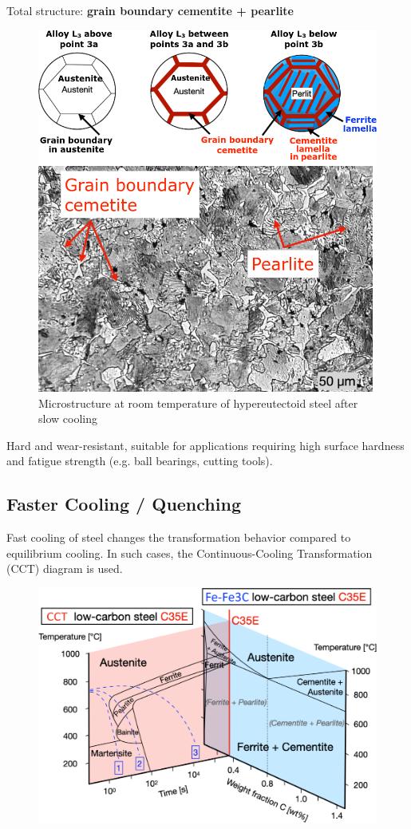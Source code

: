 \documentclass{article}
\begin{document}
Total structure: \textbf{grain boundary cementite + pearlite}

\begin{figure}[ht!]
  \centering
  \includegraphics[width=.7\textwidth]{media/hypereutectic_microstructure.png}
  \caption*{Microstructure at room temperature of hypereutectoid steel after slow cooling}
\end{figure}

Hard and wear-resistant, suitable for applications requiring high surface
hardness and fatigue strength (e.g. ball bearings, cutting tools).

\newpage
\subsection{Faster Cooling / Quenching}
Fast cooling of steel changes the transformation behavior compared to
equilibrium cooling. In such cases, the Continuous-Cooling Transformation (CCT) diagram is used.

\begin{figure}[ht!]
  \centering
  \includegraphics[width=\textwidth]{media/CCT_diagram.png}
\end{figure}
\end{document}
